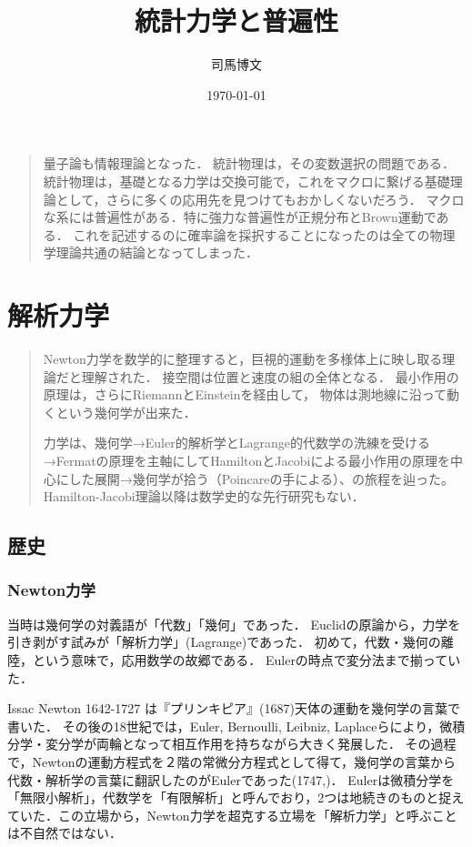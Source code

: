 \documentclass[uplatex,dvipdfmx]{jsreport}
\title{統計力学と普遍性}
\author{司馬博文}
\date{\today}
\begin{document}
\tableofcontents

\begin{quotation}
    量子論も情報理論となった．
    統計物理は，その変数選択の問題である．
    統計物理は，基礎となる力学は交換可能で，これをマクロに繋げる基礎理論として，さらに多くの応用先を見つけてもおかしくないだろう．
    マクロな系には普遍性がある．特に強力な普遍性が正規分布とBrown運動である．
    これを記述するのに確率論を採択することになったのは全ての物理学理論共通の結論となってしまった．
\end{quotation}

\chapter{解析力学}

\begin{quotation}
    Newton力学を数学的に整理すると，巨視的運動を多様体上に映し取る理論だと理解された．
    接空間は位置と速度の組の全体となる．
    最小作用の原理は，さらにRiemannとEinsteinを経由して，
    物体は測地線に沿って動くという幾何学が出来た．

    力学は、幾何学→Euler的解析学とLagrange的代数学の洗練を受ける→Fermatの原理を主軸にしてHamiltonとJacobiによる最小作用の原理を中心にした展開→幾何学が拾う（Poincareの手による）、の旅程を辿った。
    Hamilton-Jacobi理論以降は数学史的な先行研究もない．
\end{quotation}

\section{歴史}

\subsection{Newton力学}

\begin{tcolorbox}[colframe=ForestGreen, colback=ForestGreen!10!white,breakable,colbacktitle=ForestGreen!40!white,coltitle=black,fonttitle=\bfseries\sffamily,
title=]
    当時は幾何学の対義語が「代数」「幾何」であった．
    Euclidの原論から，力学を引き剥がす試みが「解析力学」(Lagrange)であった．
    初めて，代数・幾何の離陸，という意味で，応用数学の故郷である．
    Eulerの時点で変分法まで揃っていた．
\end{tcolorbox}

\begin{history}[幾何学の時代]
    Issac Newton 1642-1727 は『プリンキピア』(1687)天体の運動を幾何学の言葉で書いた．
    その後の18世紀では，Euler, Bernoulli, Leibniz, Laplaceらにより，微積分学・変分学が両輪となって相互作用を持ちながら大きく発展した．
    その過程で，Newtonの運動方程式を２階の常微分方程式として得て，幾何学の言葉から代数・解析学の言葉に翻訳したのがEulerであった(1747,\cite{Euler1747})．
    Eulerは微積分学を「無限小解析」，代数学を「有限解析」と呼んでおり，2つは地続きのものと捉えていた．この立場から，Newton力学を超克する立場を「解析力学」と呼ぶことは不自然ではない．
\end{history}
\end{document}
